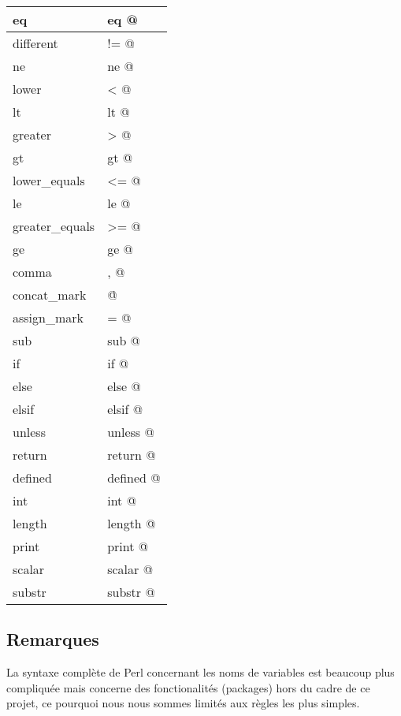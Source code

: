 \documentclass[a4paper,10pt]{article}
\begin{document}
\begin{center}
\begin{tabular}{ | l | l |}
		    	\hline eq & \verb@ eq @ \\
		    	\hline different & \verb@ != @ \\
		    	\hline ne & \verb@ ne @ \\
		    	\hline lower & \verb@ < @ \\
		    	\hline lt & \verb@ lt @ \\
		    	\hline greater & \verb@ > @ \\
		    	\hline gt & \verb@ gt @ \\
		    	\hline lower\_equals & \verb@ <= @ \\
		    	\hline le & \verb@ le @ \\
		    	\hline greater\_equals & \verb@ >= @ \\
		    	\hline ge & \verb@ ge @ \\
		    	\hline comma & \verb@ , @ \\
		    	\hline concat\_mark & \verb@ \. @ \\
		    	\hline assign\_mark & \verb@ = @ \\
		    	\hline sub & \verb@ sub @ \\
		    	\hline if & \verb@ if @ \\
		    	\hline else & \verb@ else @ \\
		    	\hline elsif & \verb@ elsif @ \\
		    	\hline unless & \verb@ unless @ \\
		    	\hline return & \verb@ return @ \\
		    	\hline defined & \verb@ defined @ \\
		    	\hline int & \verb@ int @ \\
		    	\hline length & \verb@ length @ \\
		    	\hline print & \verb@ print @ \\
		    	\hline scalar & \verb@ scalar @ \\
		    	\hline substr & \verb@ substr @ \\
		    	\hline
		    \end{tabular}
		\end{center}
	
	\subsection{Remarques}
		La syntaxe complète de Perl concernant les noms de variables est beaucoup plus
		compliquée mais concerne des fonctionalités (packages) hors du cadre de ce
		projet, ce pourquoi nous nous sommes limités aux règles les plus simples.
	
\end{document}
